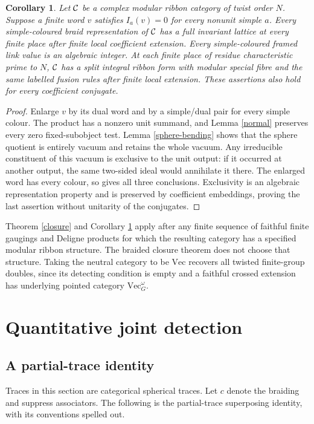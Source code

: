 \documentclass[10pt]{amsart}
\newtheorem{corollary}[theorem]{Corollary}
\begin{document}
\begin{corollary}\label{arithmetic}
Let $\mathcal C$ be a complex modular ribbon category of twist order
$N$. Suppose a finite word $v$ satisfies $I_a(v)=0$ for every
nonunit simple $a$. Every simple-coloured braid representation
of $\mathcal C$ has a full invariant lattice at every finite place
after finite local coefficient extension. Every simple-coloured
framed link value is an algebraic integer. At each finite
place of residue characteristic prime to $N$, $\mathcal C$ has a
split integral ribbon form with modular special fibre and
the same labelled fusion rules after finite local extension.
These assertions also hold for every coefficient conjugate.
\end{corollary}
\begin{proof}
Enlarge $v$ by its dual word and by a simple/dual pair for
every simple colour. The product has a nonzero unit summand,
and Lemma \ref{normal} preserves every zero fixed-subobject
test. Lemma \ref{sphere-bending} shows that the sphere
quotient is entirely vacuum and retains the whole vacuum.
Any irreducible constituent of this vacuum is exclusive
to the unit output: if it occurred at another output,
the same two-sided ideal would annihilate it there.
The enlarged word has every colour, so
\cite[Theorem 17]{P56} gives all three conclusions.
Exclusivity is an algebraic representation property and
is preserved by coefficient embeddings, proving the last
assertion without unitarity of the conjugates.
\end{proof}

Theorem \ref{closure} and Corollary \ref{arithmetic} apply
after any finite sequence of faithful finite gaugings and
Deligne products for which the resulting category has a
specified modular ribbon structure. The braided closure
theorem does not choose that structure.
Taking the neutral category to be $\mathrm{Vec}$ recovers
all twisted finite-group doubles, since its detecting
condition is empty and a faithful crossed extension has
underlying pointed category $\mathrm{Vec}_G^\omega$.


\section{Quantitative joint detection}
\subsection{A partial-trace identity}
Traces in this section are categorical spherical traces. Let $c$ denote
the braiding and suppress associators. The following is the
partial-trace superposing identity, with its conventions spelled out.
\end{document}
